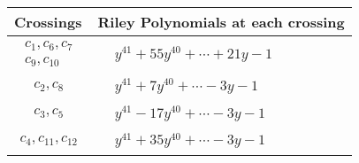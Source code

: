 \documentclass[1p]{elsarticle_modified}
\theoremstyle{definition}
\begin{document}
\begin{tabular}{m{50pt}|m{274pt}}
Crossings & \hspace{64pt}Riley Polynomials at each crossing \\
\hline $$\begin{aligned}c_{1},c_{6},c_{7}\\c_{9},c_{10}\end{aligned}$$&$\begin{aligned}
&y^{41}+55 y^{40}+\cdots+21 y-1
\end{aligned}$\\
\hline $$\begin{aligned}c_{2},c_{8}\end{aligned}$$&$\begin{aligned}
&y^{41}+7 y^{40}+\cdots-3 y-1
\end{aligned}$\\
\hline $$\begin{aligned}c_{3},c_{5}\end{aligned}$$&$\begin{aligned}
&y^{41}-17 y^{40}+\cdots-3 y-1
\end{aligned}$\\
\hline $$\begin{aligned}c_{4},c_{11},c_{12}\end{aligned}$$&$\begin{aligned}
&y^{41}+35 y^{40}+\cdots-3 y-1
\end{aligned}$\\
\hline
\end{tabular}
\vskip 2pc
\end{document}
